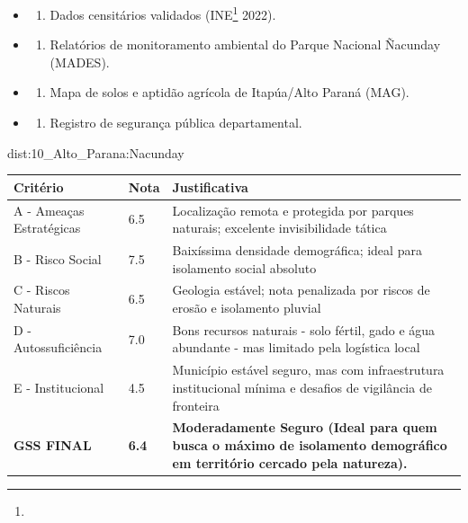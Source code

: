 {\begin{itemize}
\tightlist
\item
  \begin{enumerate}
  \def\labelenumi{\arabic{enumi})}
  \tightlist
  \item
    Dados censitários validados (INE\footnote{\fineINE} 2022).
  \end{enumerate}
\item
  \begin{enumerate}
  \def\labelenumi{\arabic{enumi})}
  \setcounter{enumi}{1}
  \tightlist
  \item
    Relatórios de monitoramento ambiental do Parque Nacional Ñacunday
    (MADES).
  \end{enumerate}
\item
  \begin{enumerate}
  \def\labelenumi{\arabic{enumi})}
  \setcounter{enumi}{2}
  \tightlist
  \item
    Mapa de solos e aptidão agrícola de Itapúa/\allowbreak Alto Paraná (MAG).
  \end{enumerate}
\item
  \begin{enumerate}
  \def\labelenumi{\arabic{enumi})}
  \setcounter{enumi}{3}
  \tightlist
  \item
    Registro de segurança pública departamental.
  \end{enumerate}
\end{itemize}}{dist:10_Alto_Parana:Nacunday}
\begin{table}[ht!]
\small \begin{tabular}{p{3.0cm}p{0.8cm}p{6.0cm}} \toprule
\textbf{Critério} & \textbf{Nota} & \textbf{Justificativa} \\ \midrule
A - Ameaças Estratégicas & 6.5 & Localização remota e protegida por parques naturais; excelente invisibilidade tática \\
B - Risco Social & 7.5 & Baixíssima densidade demográfica; ideal para isolamento social absoluto \\
C - Riscos Naturais & 6.5 & Geologia estável; nota penalizada por riscos de erosão e isolamento pluvial \\
D - Autossuficiência & 7.0 & Bons recursos naturais - solo fértil, gado e água abundante - mas limitado pela logística local \\
E - Institucional & 4.5 & Município estável seguro, mas com infraestrutura institucional mínima e desafios de vigilância de fronteira \\
\midrule \textbf{GSS FINAL} & \textbf{6.4} & \textbf{Moderadamente Seguro (Ideal para quem busca o máximo de isolamento demográfico em território cercado pela natureza).} \\ \bottomrule \end{tabular}
\end{table}
